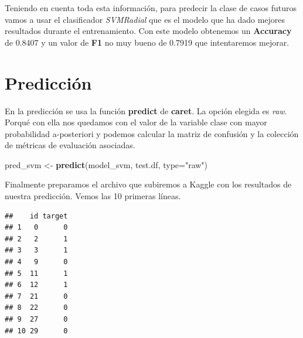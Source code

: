 \documentclass[]{article}
\newenvironment{Shaded}{\begin{snugshade}}{\end{snugshade}}
\newcommand{\DataTypeTok}[1]{\textcolor[rgb]{0.13,0.29,0.53}{#1}}
\newcommand{\DecValTok}[1]{\textcolor[rgb]{0.00,0.00,0.81}{#1}}
\newcommand{\KeywordTok}[1]{\textcolor[rgb]{0.13,0.29,0.53}{\textbf{#1}}}
\newcommand{\NormalTok}[1]{#1}
\newcommand{\OperatorTok}[1]{\textcolor[rgb]{0.81,0.36,0.00}{\textbf{#1}}}
\newcommand{\OtherTok}[1]{\textcolor[rgb]{0.56,0.35,0.01}{#1}}
\newcommand{\StringTok}[1]{\textcolor[rgb]{0.31,0.60,0.02}{#1}}
\begin{document}
Teniendo en cuenta toda esta información, para predecir la clase de
casos futuros vamos a usar el clasificador \emph{SVMRadial} que es el
modelo que ha dado mejores resultados durante el entrenamiento. Con este
modelo obtenemos un \textbf{Accuracy} de 0.8407 y un valor de
\textbf{F1} no muy bueno de 0.7919 que intentaremos mejorar.

\hypertarget{predicciuxf3n}{%
\section{Predicción}\label{predicciuxf3n}}

En la predicción se usa la función \textbf{predict} de \textbf{caret}.
La opción elegida es \emph{raw}. Porqué con ella nos quedamos con el
valor de la variable clase con mayor probabilidad a-posteriori y podemos
calcular la matriz de confusión y la colección de métricas de evaluación
asociadas.

\begin{Shaded}
\begin{Highlighting}[]
\NormalTok{pred_svm <-}\StringTok{ }\KeywordTok{predict}\NormalTok{(model_svm, test.df, }\DataTypeTok{type=}\StringTok{"raw"}\NormalTok{)}
\end{Highlighting}
\end{Shaded}

Finalmente preparamos el archivo que subiremos a Kaggle con los
resultados de nuestra predicción. Vemos las 10 primeras líneas.

\begin{Shaded}
\end{Shaded}

\begin{verbatim}
##    id target
## 1   0      0
## 2   2      1
## 3   3      1
## 4   9      0
## 5  11      1
## 6  12      1
## 7  21      0
## 8  22      0
## 9  27      0
## 10 29      0
\end{verbatim}
\end{document}
